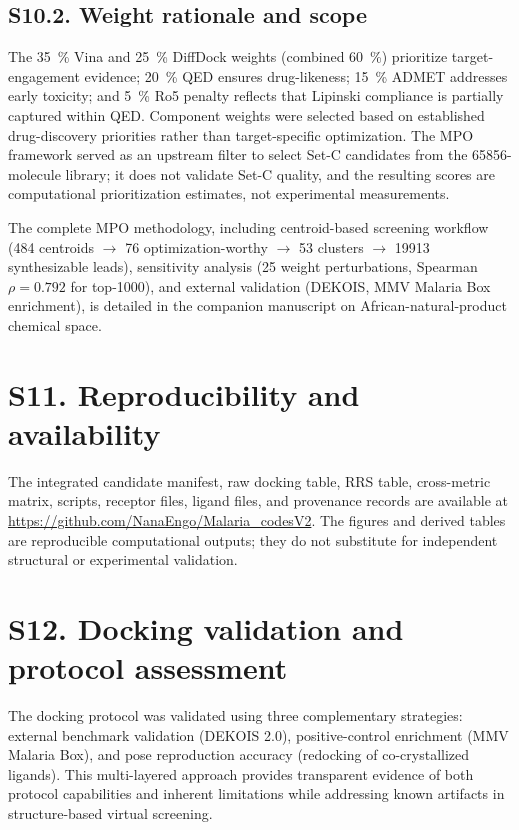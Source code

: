 \documentclass[journal=jcisd8,manuscript=suppinfo]{achemso}
\begin{document}
\subsection*{S10.2. Weight rationale and scope}
The \qty{35}{\percent} Vina and \qty{25}{\percent} DiffDock weights (combined \qty{60}{\percent}) prioritize target-engagement evidence; \qty{20}{\percent} QED ensures drug-likeness; \qty{15}{\percent} ADMET addresses early toxicity; and \qty{5}{\percent} Ro5 penalty reflects that Lipinski compliance is partially captured within QED. Component weights were selected based on established drug-discovery priorities \cite{Hughes2008,Gleeson2008,Lipinski2004} rather than target-specific optimization. The MPO framework served as an upstream filter to select Set-C candidates from the \num{65856}-molecule library; it does not validate Set-C quality, and the resulting scores are computational prioritization estimates, not experimental measurements.

The complete MPO methodology, including centroid-based screening workflow (\num{484} centroids $\rightarrow$ \num{76} optimization-worthy $\rightarrow$ \num{53} clusters $\rightarrow$ \num{19913} synthesizable leads), sensitivity analysis (\num{25} weight perturbations, Spearman $\rho = \num{0.792}$ for top-1000), and external validation (DEKOIS, MMV Malaria Box enrichment), is detailed in the companion manuscript on African-natural-product chemical space.

\section*{S11. Reproducibility and availability}
The integrated candidate manifest, raw docking table, RRS table, cross-metric matrix, scripts, receptor files, ligand files, and provenance records are available at \url{https://github.com/NanaEngo/Malaria_codesV2}. The figures and derived tables are reproducible computational outputs; they do not substitute for independent structural or experimental validation.

\section*{S12. Docking validation and protocol assessment}
The docking protocol was validated using three complementary strategies: external benchmark validation (DEKOIS 2.0), positive-control enrichment (MMV Malaria Box), and pose reproduction accuracy (redocking of co-crystallized ligands). This multi-layered approach provides transparent evidence of both protocol capabilities and inherent limitations while addressing known artifacts in structure-based virtual screening.
\end{document}
